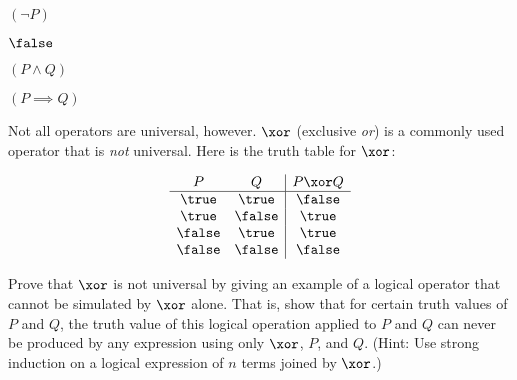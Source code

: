 \documentclass[12pt,oneside]{article}
\begin{document}
\begin{problem}{20}
\bsubparts
\psubpart $(\neg P)$


\psubpart $\false$




\psubpart $(P \wedge Q)$



\psubpart $(P \implies Q)$%


\esubparts



 Not all operators are universal, however. $\xor$ (exclusive \emph{or}) is a commonly used operator that is \emph{not} universal. Here is the truth table for $\xor$:

\[
\begin{array}{cc|c}
P & Q & P \xor Q \\ \hline
\true & \true & \false \\
\true & \false & \true \\
\false & \true & \true \\
\false & \false & \false
\end{array}
\]

Prove that $\xor$ is not universal by giving an example of a logical operator that cannot be simulated by $\xor$ alone. That is, show that for certain truth values of $P$ and $Q$, the truth value of this logical operation applied to $P$ and $Q$ can never be produced by any expression using only $\xor$, $P$, and $Q$. (Hint: Use strong induction on a logical expression of $n$ terms joined by $\xor$.)


\end{problem}
\end{document}
